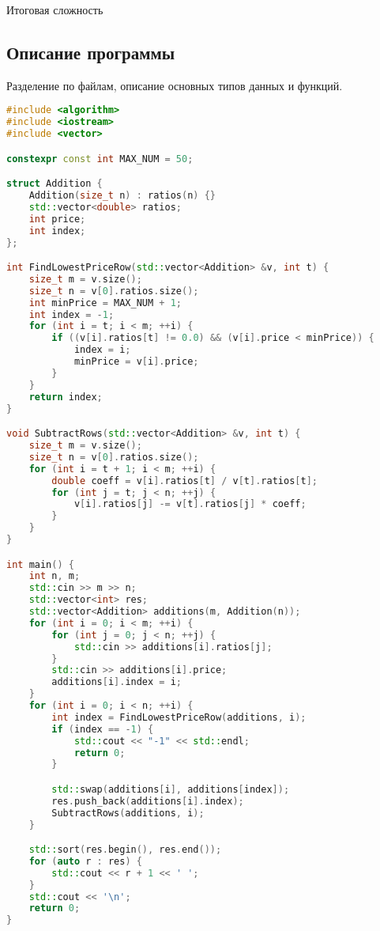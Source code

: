 \documentclass[12pt]{article}
\begin{document}
Итоговая сложность

\subsection*{Описание программы}

Разделение по файлам, описание основных типов данных и функций. \\

\begin{lstlisting}[language=C++]
#include <algorithm>
#include <iostream>
#include <vector>

constexpr const int MAX_NUM = 50;

struct Addition {
    Addition(size_t n) : ratios(n) {}
    std::vector<double> ratios;
    int price;
    int index;
};

int FindLowestPriceRow(std::vector<Addition> &v, int t) {
    size_t m = v.size();
    size_t n = v[0].ratios.size();
    int minPrice = MAX_NUM + 1;
    int index = -1;
    for (int i = t; i < m; ++i) {
        if ((v[i].ratios[t] != 0.0) && (v[i].price < minPrice)) {
            index = i;
            minPrice = v[i].price;
        }
    }
    return index;
}

void SubtractRows(std::vector<Addition> &v, int t) {
    size_t m = v.size();
    size_t n = v[0].ratios.size();
    for (int i = t + 1; i < m; ++i) {
        double coeff = v[i].ratios[t] / v[t].ratios[t];
        for (int j = t; j < n; ++j) {
            v[i].ratios[j] -= v[t].ratios[j] * coeff;
        }
    }
}

int main() {
    int n, m;
    std::cin >> m >> n;
    std::vector<int> res;
    std::vector<Addition> additions(m, Addition(n));
    for (int i = 0; i < m; ++i) {
        for (int j = 0; j < n; ++j) {
            std::cin >> additions[i].ratios[j];
        }
        std::cin >> additions[i].price;
        additions[i].index = i;
    }
    for (int i = 0; i < n; ++i) {
        int index = FindLowestPriceRow(additions, i);
        if (index == -1) {
            std::cout << "-1" << std::endl;
            return 0;
        }

        std::swap(additions[i], additions[index]);
        res.push_back(additions[i].index);
        SubtractRows(additions, i);
    }

    std::sort(res.begin(), res.end());
    for (auto r : res) {
        std::cout << r + 1 << ' ';
    }
    std::cout << '\n';
    return 0;
}
\end{lstlisting}
\end{document}
